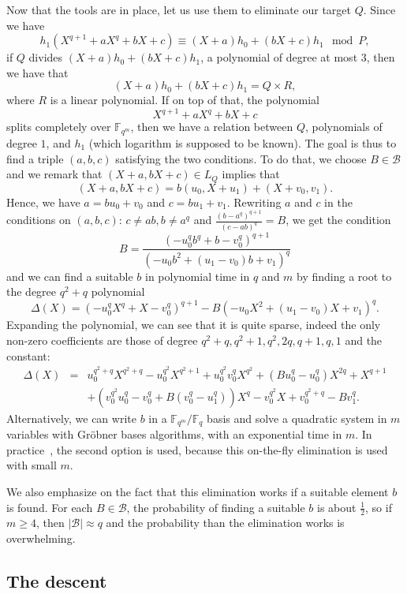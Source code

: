 \documentclass[a4paper,11pt]{article}
\theoremstyle{break}
\theoremstyle{sc}
\theoremstyle{definition}
\theoremstyle{remark}
\begin{document}
Now that the tools are in place, let us use them to eliminate our target
$Q$. Since we have
\[
  h_1(X^{q+1}+aX^q+bX+c)\equiv(X+a)h_0+(bX+c)h_1\mod P,
\]
if $Q$ divides $(X+a)h_0+(bX+c)h_1$, a polynomial of degree at most $3$, then we
have that
\[
  (X+a)h_0+(bX+c)h_1=Q\times R,
\]
where $R$ is a linear polynomial. If
on top of that, the polynomial 
\[
  X^{q+1}+aX^q+bX+c
\]
splits completely over
$\mathbb{F}_{q^m}$, then we have a relation between $Q$, polynomials of degree
$1$, and $h_1$ (which logarithm is supposed to be known). The goal is thus to
find a triple $(a, b, c)$ satisfying the two conditions. To do that, we choose
$B\in \mathcal B$ and we remark that $(X+a,
bX+c)\in L_Q$ implies that 
\[
  (X+a, bX+c)=b(u_0, X+u_1)+(X+v_0, v_1).
\]
Hence, we
have $a=bu_0+v_0$ and $c=bu_1+v_1$. Rewriting $a$ and $c$ in the conditions
on $(a,b,c)$: $c\neq ab,b\neq a^q$ and $\frac{(b-a^q)^{q+1}}{(c-ab)^q}=B$, we
get the condition
\[
  B = \frac{(-u_0^qb^q+b-v_0^q)^{q+1}}{(-u_0b^2+(u_1-v_0)b+v_1)^q}
\]
and we can find a suitable $b$ in polynomial time in $q$ and $m$ by finding a
root to the degree
$q^2+q$ polynomial
\[
  \Delta(X) = (-u_0^qX^q+X-v_0^q)^{q+1} - B(-u_0X^2+(u_1-v_0)X+v_1)^q.
\]
Expanding the polynomial, we can see that it is quite sparse, indeed the only
non-zero coefficients are those of degree $q^2+q, q^2+1, q^2, 2q, q+1, q, 1$ and
the constant:
\begin{eqnarray*}
  \Delta(X) &=&
  u_0^{q^2+q}X^{q^2+q}-u_0^{q^2}X^{q^2+1}+u_0^{q^2}v_0^qX^{q^2}+(Bu_0^q-u_0^q)X^{2q}+X^{q+1} \\
  & & +(v_0^{q^2}u_0^q-v_0^q+B(v_0^q-u_1^q))X^q-v_0^{q^2}X+v_0^{q^2+q}-Bv_1^q.
\end{eqnarray*}
Alternatively, we can write $b$ in a $\mathbb{F}_{q^m}/\mathbb{F}_q$
basis and solve a quadratic system in $m$ variables with Gröbner bases
algorithms, with an exponential time in $m$. In practice~\cite{Adj16}, the
second option is used, because this on-the-fly elimination is used with small $m$.

We also emphasize on the fact that this elimination works if a suitable element
$b$ is found. For each $B\in\mathcal B$, the probability of finding a suitable
$b$ is about $\frac{1}{2}$, so if
$m\geq4$, then $|\mathcal B|\approx q$ and the probability than the
elimination works is overwhelming.

\subsection{The descent}
\end{document}
